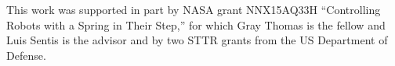 \documentclass[utf8]{frontiersSCNS}
\begin{document}
	This work was supported in part by NASA grant NNX15AQ33H ``Controlling Robots with a Spring in Their Step,'' for which Gray Thomas is the fellow and Luis Sentis is the advisor and by two STTR grants from the US Department of Defense.





	




	

	
\end{document}
